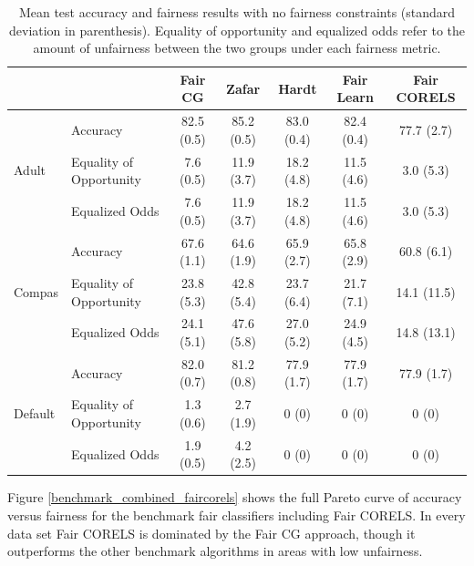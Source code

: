\documentclass[twoside,11pt]{article}
\begin{document}
{\begin{table}[t]
\footnotesize
\centering
\caption{\label{accTableFairCorelsNoConst} Mean test accuracy and fairness results with no fairness constraints (standard deviation in parenthesis). Equality of opportunity and equalized odds refer to the amount of unfairness between the two groups under each fairness metric.}
\setlength{\tabcolsep}{5pt} %
\begin{tabular}{l l  c c c c c}		\toprule
& & Fair CG & Zafar & Hardt & Fair Learn & Fair CORELS\\\midrule
\multirow{3}{*}{Adult} & Accuracy & 82.5 (0.5) & 85.2 (0.5) & 83.0 (0.4) & 82.4 (0.4) &  77.7 (2.7) \\
& Equality of Opportunity & 7.6 (0.5) & 11.9 (3.7) & 18.2 (4.8) & 11.5 (4.6) & 3.0 (5.3)\\
& Equalized Odds & 7.6 (0.5) & 11.9 (3.7) &  18.2 (4.8) & 11.5 (4.6) & 3.0 (5.3)\\ \midrule
\multirow{3}{*}{Compas} & Accuracy & 67.6 (1.1) & 64.6 (1.9) & 65.9 (2.7) & 65.8 (2.9) & 60.8 (6.1)\\
& Equality of Opportunity & 23.8 (5.3)& 42.8 (5.4) & 23.7 (6.4) & 21.7 (7.1) &  14.1 (11.5) \\
& Equalized Odds &24.1 (5.1) & 47.6 (5.8)& 27.0 (5.2) & 24.9 (4.5) &  14.8 (13.1)\\ \midrule
\multirow{3}{*}{Default} & Accuracy & 82.0 (0.7) & 81.2 (0.8) & 77.9 (1.7) & 77.9 (1.7) & 77.9 (1.7) \\
& Equality of Opportunity & 1.3 (0.6) & 2.7 (1.9) & 0 (0) & 0 (0) & 0 (0) \\
& Equalized Odds & 1.9 (0.5) & 4.2 (2.5) & 0 (0) & 0 (0) &  0 (0)\\ 
\bottomrule
\end{tabular}%
\end{table}%

Figure \ref{benchmark_combined_faircorels} shows the full Pareto curve of accuracy versus fairness for the benchmark fair classifiers including Fair CORELS. In every data set Fair CORELS is dominated by the Fair CG approach, though it outperforms the other benchmark algorithms in areas with low unfairness.

}
\end{document}
